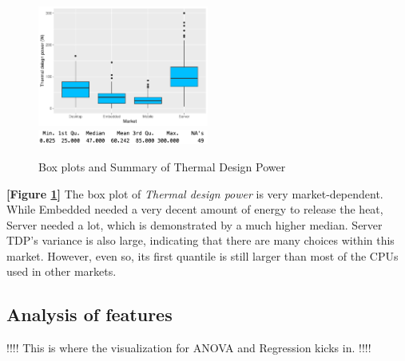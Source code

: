 \begin{figure}[H]
    \centering
    \includegraphics[width=0.5\textwidth]{./graphics/box_tdp.pdf}
    \includegraphics[width=0.5\textwidth]{./graphics/sum_tdp.png}
    \caption{Box plots and Summary of Thermal Design Power}
    \label{fig:box_tdp}
\end{figure}

\textbf{[Figure \ref{fig:box_tdp}]} The box plot of \textit{Thermal design power} is very market-dependent. While Embedded needed a very decent amount of
energy to release the heat, Server needed a lot, which is demonstrated by a much higher median. Server TDP's variance is also large, indicating
that there are many choices within this market. However, even so, its first quantile is still larger than most of the CPUs used in other markets.











\subsection{Analysis of features}

!!!! This is where the visualization for ANOVA and Regression kicks in. !!!!
